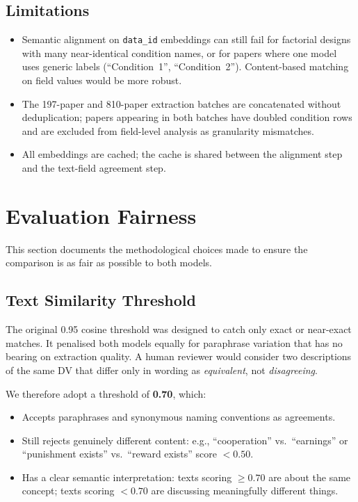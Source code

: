 \documentclass[11pt,a4paper]{article}
\begin{document}
\subsection{Limitations}
\begin{itemize}
  \item Semantic alignment on \texttt{data\_id} embeddings can still fail
    for factorial designs with many near-identical condition names, or for
    papers where one model uses generic labels (``Condition~1'', ``Condition~2'').
    Content-based matching on field values would be more robust.
  \item The 197-paper and 810-paper extraction batches are concatenated
    without deduplication; papers appearing in both batches have doubled
    condition rows and are excluded from field-level analysis as granularity
    mismatches.
  \item All embeddings are cached; the cache is shared between the alignment
    step and the text-field agreement step.
\end{itemize}


        \section{Evaluation Fairness}

        This section documents the methodological choices made to ensure the
        comparison is as fair as possible to both models.

        \subsection{Text Similarity Threshold}

        The original 0.95 cosine threshold was designed to catch only exact or near-exact
        matches. It penalised both models equally for paraphrase variation that has no
        bearing on extraction quality.  A human reviewer would consider two descriptions
        of the same DV that differ only in wording as \emph{equivalent}, not
        \emph{disagreeing}.

        We therefore adopt a threshold of \textbf{0.70}, which:
        \begin{itemize}
          \item Accepts paraphrases and synonymous naming conventions as agreements.
          \item Still rejects genuinely different content: e.g., ``cooperation'' vs.\
            ``earnings'' or ``punishment exists'' vs.\ ``reward exists'' score $<0.50$.
          \item Has a clear semantic interpretation: texts scoring $\geq0.70$
            are about the same concept; texts scoring $<0.70$ are discussing
            meaningfully different things.
        \end{itemize}
\end{document}
